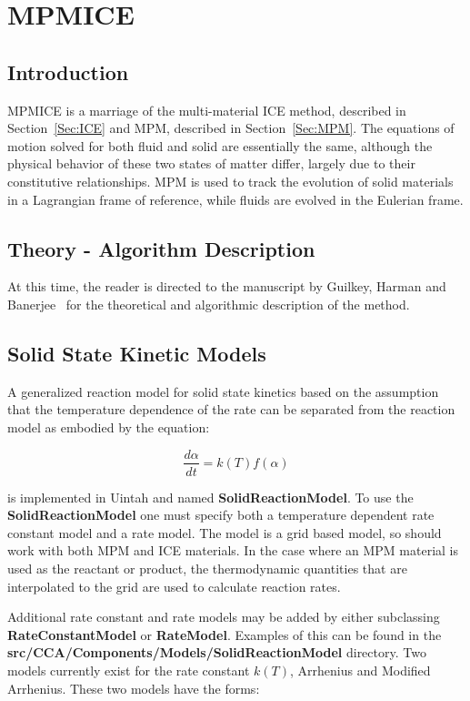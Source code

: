 
\chapter{MPMICE} \label{Sec:MPMICE}

\section{Introduction}

MPMICE is a marriage of the multi-material ICE method, described in
Section~\ref{Sec:ICE} and MPM, described in Section~\ref{Sec:MPM}.
The equations of motion solved for both fluid and solid are essentially
the same, although the physical behavior of these two states of matter
differ, largely due to their constitutive relationships.  MPM is used
to track the evolution of solid materials in a Lagrangian frame of
reference, while fluids are evolved in the Eulerian frame.

\section{Theory - Algorithm Description}

At this time, the reader is directed to the manuscript by Guilkey,
Harman and Banerjee~\cite{fourthmit} for the theoretical and algorithmic
description of the method.

\section{Solid State Kinetic Models}

A generalized reaction model for solid state kinetics based on the
assumption that the temperature dependence of the rate can be separated
from the reaction model as embodied by the equation:

\begin{equation}
\frac{d\alpha}{dt}=k(T)f(\alpha)
\end{equation}

\noindent is implemented in Uintah and named \textbf{SolidReactionModel}.  To
use the \textbf{SolidReactionModel} one must specify both a temperature
dependent rate constant model and a rate model.  The model is a grid based
model, so should work with both MPM and ICE materials.  In the case where an MPM
material is used as the reactant or product, the thermodynamic quantities
that are interpolated to the grid are used to calculate reaction rates.   

Additional rate constant and rate models may be added by either subclassing \textbf{RateConstantModel}
or \textbf{RateModel}.  Examples of this can be found in the 
\textbf{src/CCA/Components/Models/SolidReactionModel}
directory. Two models currently exist for the rate constant $k(T)$, Arrhenius and
Modified Arrhenius.  These two models have the forms:

